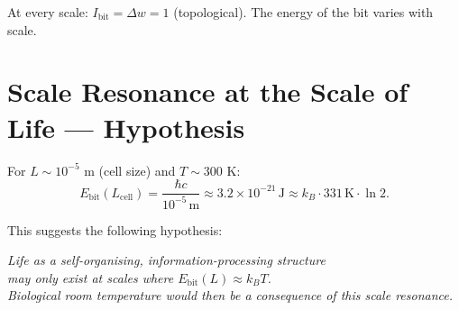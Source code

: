 \begin{center}
\renewcommand{\arraystretch}{1.4}
\end{center}

At every scale: \(I_\text{bit} = \Delta w = 1\) (topological).
The energy of the bit varies with scale.

\section{Scale Resonance at the Scale of Life — Hypothesis}

For \(L \sim 10^{-5}\) m (cell size) and \(T \sim 300\) K:
\begin{equation}
  E_\text{bit}(L_\text{cell}) = \frac{\hbar c}{10^{-5}\,\text{m}}
  \approx 3.2 \times 10^{-21}\,\text{J}
  \approx k_B \cdot 331\,\text{K} \cdot \ln 2.
\end{equation}

This suggests the following hypothesis:

\begin{center}
\textit{Life as a self-organising, information-processing structure\\
may only exist at scales where \(E_\text{bit}(L) \approx k_BT\).\\
Biological room temperature would then be a consequence of this scale resonance.}
\end{center}

